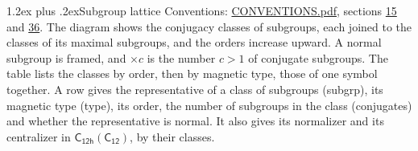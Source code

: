 \documentclass[10pt,a4paper]{article}
\makeatletter
\renewcommand\section{\@startsection{section}{1}{\z@}{-3ex plus -1ex minus -.2ex}%
  {1.2ex plus .2ex}{\normalfont\large\sffamily\bfseries\color{parttitle}}}
\numberwithin{equation}{section}
\newcommand{\grp}[1]{\mathsf{#1}}
\makeatother
\begin{document}
\section{Subgroup lattice}\label{s:subgroups}
Conventions: \href{../../CONVENTIONS.pdf}{CONVENTIONS.pdf}, sections \href{../../../rotation/CONVENTIONS.pdf\#conv.15}{15} and \href{../../CONVENTIONS.pdf\#conv.36}{36}.
The diagram shows the conjugacy classes of subgroups, each joined to the classes of its maximal subgroups, and the orders increase upward. \label{n:index.conjugates.c}A normal subgroup is framed, and ${\times}c$ is the number $c > 1$ of conjugate subgroups. The table lists the classes by order, then by magnetic type, those of one symbol together. \label{n:head.subgroup}\label{n:head.magnetic.type}\label{n:head.order}\label{n:head.conjugates}\label{n:head.normal}A row gives the representative of a class of subgroups (subgrp), its magnetic type (type), its order, the number of subgroups in the class (conjugates) and whether the representative is normal. \label{n:head.normalizer}\label{n:head.centralizer}It also gives its normalizer and its centralizer in $\grp{C_{12h}}(\grp{C_{12}})$, by their classes. 
\end{document}
